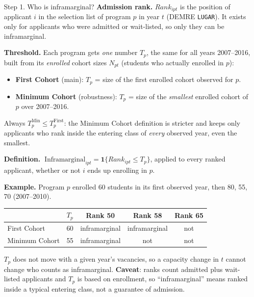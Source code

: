 \documentclass{beamer}
\begin{document}
\begin{frame}{Step 1. Who is inframarginal?}
\scriptsize
\textbf{Admission rank.} $Rank_{ipt}$ is the position of applicant $i$ in the selection list of program $p$ in year $t$
(DEMRE \texttt{LUGAR}). It exists only for applicants who were admitted or wait-listed, so only they can be inframarginal.

\vspace{0.08cm}
\textbf{Threshold.} Each program gets \emph{one} number $T_p$, the same for all years 2007--2016, built from its
\emph{enrolled} cohort sizes $N_{pt}$ (students who actually enrolled in $p$):
\begin{itemize}
    \item \textbf{First Cohort} (main): $T_p$ = size of the first enrolled cohort observed for $p$.
    \item \textbf{Minimum Cohort} (robustness): $T_p$ = size of the \emph{smallest} enrolled cohort of $p$ over 2007--2016.
\end{itemize}
Always $T_p^{\text{Min}}\le T_p^{\text{First}}$: the Minimum Cohort definition is stricter and keeps only applicants who rank inside the
entering class of \emph{every} observed year, even the smallest.

\vspace{0.08cm}
\textbf{Definition.}
$\;\text{Inframarginal}_{ipt}=\mathbf 1\{Rank_{ipt}\le T_p\}$, applied to every ranked applicant, whether or not $i$ ends up enrolling in $p$.

\vspace{0.08cm}
\textbf{Example.} Program $p$ enrolled 60 students in its first observed year, then 80, 55, 70 (2007--2010).
\begin{center}
\begin{tabular}{lcccc}
\toprule
 & $T_p$ & Rank 50 & Rank 58 & Rank 65 \\
\midrule
First Cohort & 60 & inframarginal & inframarginal & not \\
Minimum Cohort & 55 & inframarginal & not & not \\
\bottomrule
\end{tabular}
\end{center}
\vspace{-0.1cm}
$T_p$ does not move with a given year's vacancies, so a capacity change in $t$ cannot change who counts as inframarginal.
\textbf{Caveat}: ranks count admitted plus wait-listed applicants and $T_p$ is based on enrollment, so ``inframarginal'' means
ranked inside a typical entering class, not a guarantee of admission.
\end{frame}
\end{document}
